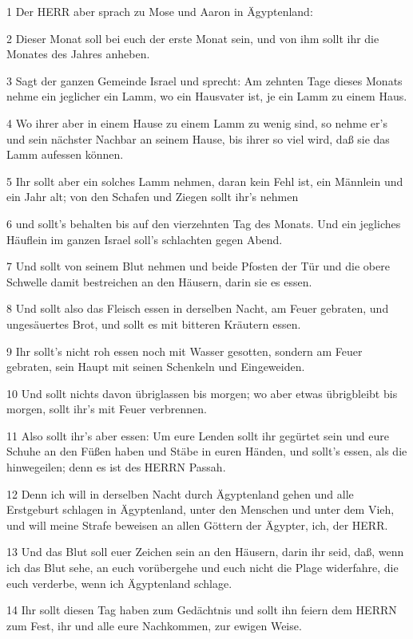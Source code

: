 \par 1 Der HERR aber sprach zu Mose und Aaron in Ägyptenland:
\par 2 Dieser Monat soll bei euch der erste Monat sein, und von ihm sollt ihr die Monates des Jahres anheben.
\par 3 Sagt der ganzen Gemeinde Israel und sprecht: Am zehnten Tage dieses Monats nehme ein jeglicher ein Lamm, wo ein Hausvater ist, je ein Lamm zu einem Haus.
\par 4 Wo ihrer aber in einem Hause zu einem Lamm zu wenig sind, so nehme er's und sein nächster Nachbar an seinem Hause, bis ihrer so viel wird, daß sie das Lamm aufessen können.
\par 5 Ihr sollt aber ein solches Lamm nehmen, daran kein Fehl ist, ein Männlein und ein Jahr alt; von den Schafen und Ziegen sollt ihr's nehmen
\par 6 und sollt's behalten bis auf den vierzehnten Tag des Monats. Und ein jegliches Häuflein im ganzen Israel soll's schlachten gegen Abend.
\par 7 Und sollt von seinem Blut nehmen und beide Pfosten der Tür und die obere Schwelle damit bestreichen an den Häusern, darin sie es essen.
\par 8 Und sollt also das Fleisch essen in derselben Nacht, am Feuer gebraten, und ungesäuertes Brot, und sollt es mit bitteren Kräutern essen.
\par 9 Ihr sollt's nicht roh essen noch mit Wasser gesotten, sondern am Feuer gebraten, sein Haupt mit seinen Schenkeln und Eingeweiden.
\par 10 Und sollt nichts davon übriglassen bis morgen; wo aber etwas übrigbleibt bis morgen, sollt ihr's mit Feuer verbrennen.
\par 11 Also sollt ihr's aber essen: Um eure Lenden sollt ihr gegürtet sein und eure Schuhe an den Füßen haben und Stäbe in euren Händen, und sollt's essen, als die hinwegeilen; denn es ist des HERRN Passah.
\par 12 Denn ich will in derselben Nacht durch Ägyptenland gehen und alle Erstgeburt schlagen in Ägyptenland, unter den Menschen und unter dem Vieh, und will meine Strafe beweisen an allen Göttern der Ägypter, ich, der HERR.
\par 13 Und das Blut soll euer Zeichen sein an den Häusern, darin ihr seid, daß, wenn ich das Blut sehe, an euch vorübergehe und euch nicht die Plage widerfahre, die euch verderbe, wenn ich Ägyptenland schlage.
\par 14 Ihr sollt diesen Tag haben zum Gedächtnis und sollt ihn feiern dem HERRN zum Fest, ihr und alle eure Nachkommen, zur ewigen Weise.
